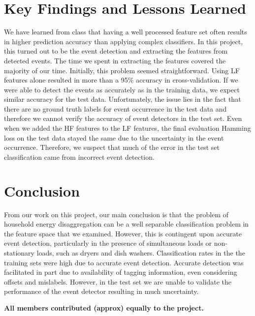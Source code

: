 \documentclass[11pt, letterpaper]{article}
\begin{document}
\section{Key Findings and Lessons Learned}
We have learned from class that having a well processed feature set often results in higher prediction accuracy than applying complex classifiers.  In this project, this turned out to be the event detection and extracting the features from detected events.  The time we spent in extracting the features covered the majority of our time.  Initially, this problem seemed straightforward.  Using LF features alone resulted in more than a 95\% accuracy in cross-validation.  If we were able to detect the events as accurately as in the training data, we expect similar accuracy for the test data.  Unfortunately, the issue lies in the fact that there are no ground truth labels for event occurrence in the test data and therefore we cannot verify the accuracy of event detectors in the test set.  Even when we added the HF features to the LF features, the final evaluation Hamming loss on the test data stayed the same due to the uncertainty in the event occurrence.  Therefore, we suspect that much of the error in the test set classification came from incorrect event detection.  

\section{Conclusion}

From our work on this project, our main conclusion is that the problem of household energy disaggregation can be a well separable classification problem in the feature space that we examined.  However, this is contingent upon accurate event detection, particularly in the presence of simultaneous loads or non-stationary loads, such as dryers and dish washers.  Classification rates in the the training sets were high due to accurate event detection.  Accurate detection was facilitated in part due to availability of tagging information, even considering offsets and mislabels.  However, in the test set we are unable to validate the performance of the event detector resulting in much uncertainty.    

\begin{center}
\textbf{All members contributed (approx) equally to the project. }
\end{center}
\end{document}
